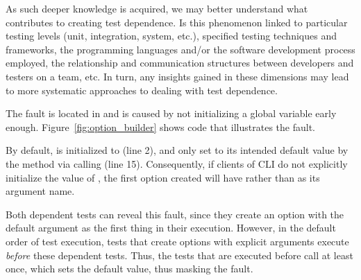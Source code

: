 
As such deeper knowledge is acquired, we may better understand
what contributes to creating test dependence. Is this
  phenomenon linked to particular testing levels (unit, integration,
  system, etc.), specified testing techniques and frameworks, the programming
languages and/or the software development process employed, the relationship
and communication structures between developers and testers on a team, etc.  In turn,
any insights gained in these dimensions may lead to more systematic
approaches to dealing with test dependence.

The fault is located in 
 and is caused by not initializing a global
variable early enough.
Figure~\ref{fig:option_builder} shows code that
illustrates the fault. 

%
By default,
 is initialized to  (line 2), and only set to
its intended default value  by the  method
via calling  (line 15). 
Consequently, if clients of CLI do not explicitly initialize the value of
, the first option created will have  rather
than  as its argument name.

Both dependent tests
can reveal this fault, since they create an option with 
the default argument as the first thing in their execution. However,
in the default order of test execution, 
tests that create options with explicit arguments execute \emph{before} 
these dependent tests.
Thus, the tests that are executed before call  at least once, which
sets the default  value, thus masking the fault.




